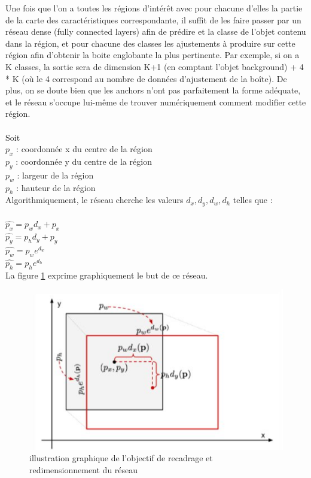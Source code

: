 Une fois que l'on a toutes les régions d'intérêt avec pour chacune d'elles la partie de la carte des caractéristiques correspondante, il suffit de les faire passer par un réseau dense (fully connected layers) afin de prédire et la classe de l'objet contenu dans la région, et pour chacune des classes les ajustements à produire sur cette région afin d'obtenir la boite englobante la plus pertinente. Par exemple, si on a K classes, la sortie sera de dimension K+1 (en comptant l'objet background) + 4 * K (où le 4 correspond au nombre de données d'ajustement de la boîte). De plus, on se doute bien que les anchors n'ont pas parfaitement la forme adéquate, et le réseau s'occupe lui-même de trouver numériquement comment modifier cette région. \\
\\
Soit \\
$p_x$ : coordonnée x du centre de la région \\
$p_y$ : coordonnée y du centre de la région \\
$p_w$ : largeur de la région \\
$p_h$ : hauteur de la région \\

Algorithmiquement, le réseau cherche les valeurs $d_x,d_y,d_w,d_h$ telles que :\\
\\
$\hat{p_x} = p_w d_x + p_x$\\
$\hat{p_y} = p_h d_y + p_y$\\
$\hat{p_w} = p_w e^{d_w}$ \\
$\hat{p_h} = p_h e^{d_h}$\\

La figure \ref{redimensionnement} exprime graphiquement le but de ce réseau.

\begin{figure}[!h]
\centering
\includegraphics[width=200pts]{images/Mask_R_CNN/redimensionnement.png} 
\caption{illustration graphique de l'objectif de recadrage et redimensionnement du réseau}
\label{redimensionnement}
\end{figure}


